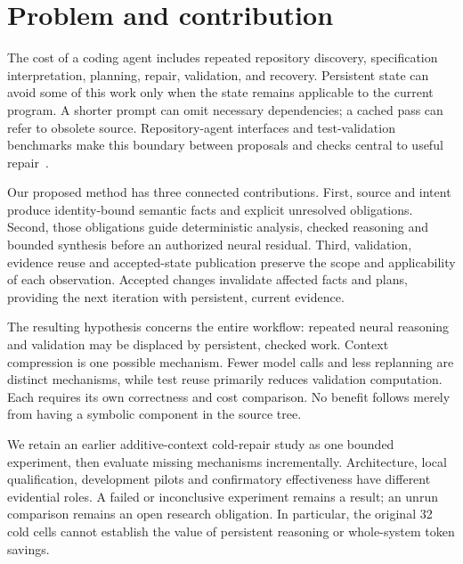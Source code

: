 \section{Problem and contribution}
\label{sec:introduction}

The cost of a coding agent includes repeated repository discovery, specification
interpretation, planning, repair, validation, and recovery. Persistent state can
avoid some of this work only when the state remains applicable to the current
program. A shorter prompt can omit necessary dependencies; a cached pass can
refer to obsolete source. Repository-agent interfaces and test-validation
benchmarks make this boundary between proposals and checks central to useful
repair~\citep{baseline08,baseline11}.

Our proposed method has three connected contributions. First, source and intent
produce identity-bound semantic facts and explicit unresolved obligations.
Second, those obligations guide deterministic analysis, checked reasoning and
bounded synthesis before an authorized neural residual. Third, validation,
evidence reuse and accepted-state publication preserve the scope and
applicability of each observation. Accepted changes invalidate affected facts
and plans, providing the next iteration with persistent, current evidence.

The resulting hypothesis concerns the entire workflow: repeated neural
reasoning and validation may be displaced by persistent, checked work.
Context compression is one possible mechanism. Fewer model calls and less
replanning are distinct mechanisms, while test reuse primarily reduces
validation computation. Each requires its own correctness and cost comparison.
No benefit follows merely from having a symbolic component in the source tree.

We retain an earlier additive-context cold-repair study as one bounded
experiment, then evaluate missing mechanisms incrementally. Architecture,
local qualification, development pilots and confirmatory effectiveness have
different evidential roles. A failed or inconclusive experiment remains a
result; an unrun comparison remains an open research obligation. In particular,
the original 32 cold cells cannot establish the value of persistent reasoning
or whole-system token savings.
